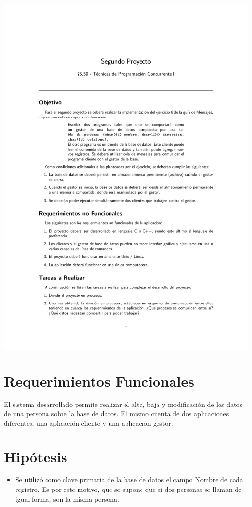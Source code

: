 \documentclass[11pt]{article}
\begin{document}
\begin{center}
\includegraphics[trim = 25mm 20mm 10mm 30mm, clip,height=0.95\textheight,width=1.04\textwidth,page={2}]{SegundoProyecto.pdf}
\end{center}

\newpage


\section{Requerimientos Funcionales}

El sistema desarrollado permite realizar el alta, baja y modificaci\'on de los datos de una persona sobre la base de datos.
El mismo cuenta de dos aplicaciones diferentes, una aplicaci\'on cliente y una aplicaci\'on gestor.


\section{Hip\'otesis}
\begin{itemize}
 \item Se utiliz\'o como clave primaria de la base de datos el campo Nombre de cada registro. Es por este motivo, que se supone que si dos 
personas se llaman de igual forma, son la misma persona.

\end{itemize}
\end{document}
